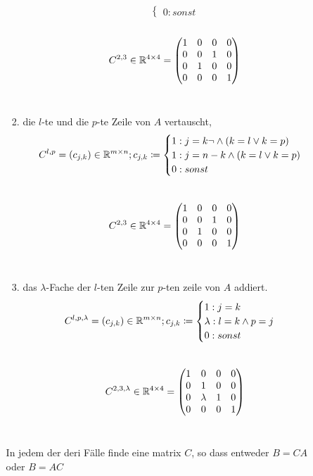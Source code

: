 \documentclass{HM}
\begin{document}
\begin{enumerate}
\begin{enumerate}
\begin{enumerate}
$$\begin{cases}
	0: sonst
\end{cases}$$\\
$$C^{2,3} \in\mathbb{R}^{4\times 4} = \begin{pmatrix}
		1&0&0&0\\
		0&0&1&0\\
		0&1&0&0\\
		0&0&0&1\\
	\end{pmatrix}$$
	\\
\item die $l$-te und die $p$-te Zeile von $A$ vertauscht,
$$C^{l,p} = (c_{j,k}) \in \mathbb{R}^{m\times n}; c_{j,k} \coloneqq \begin{cases}
	1: j=k \lnot\land (k=l \lor k=p)\\
	1: j=n-k \land (k=l \lor k=p) \\
	0: sonst
\end{cases}$$\\
$$C^{2,3} \in\mathbb{R}^{4\times 4} = \begin{pmatrix}
	1&0&0&0\\
	0&0&1&0\\
	0&1&0&0\\
	0&0&0&1\\
\end{pmatrix}$$
\\
\item das $\lambda$-Fache der $l$-ten Zeile zur $p$-ten zeile von $A$ addiert.\\
$$C^{l,p,\lambda} = (c_{j,k}) \in \mathbb{R}^{m\times n}; c_{j,k} \coloneqq \begin{cases}
	1: j=k\\
	\lambda: l=k \land p=j\\
	0: sonst
\end{cases}$$\\
$$C^{2,3,\lambda} \in\mathbb{R}^{4\times 4} = \begin{pmatrix}
	1&0&0&0\\
	0&1&0&0\\
	0&\lambda&1&0\\
	0&0&0&1\\
\end{pmatrix}$$
\\
\end{enumerate}
In jedem der deri Fälle finde eine matrix $C$, so dass entweder $B=CA$ oder $B=AC$
\end{enumerate}
\end{enumerate}
\end{document}
